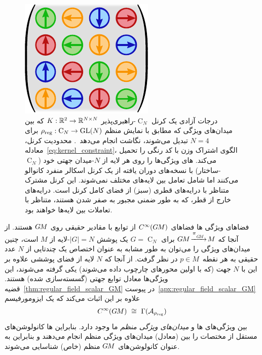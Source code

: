\begin{figure}
    \hspace*{-2ex}
    \includegraphics[width=.24\columnwidth]{figures/regular_C4_kernel.pdf}
    \captionsetup{width=1.1\columnwidth}
    \hspace{2ex}
    \caption{\small
        درجات آزادی یک کرنل $\operatorname{C}_N$-راهبری‌پذیر ${K: \mathbb{R}^2 \to \mathbb{R}^{N\times N}}$ که بین میدان‌های ویژگی که مطابق با نمایش منظم ${\rho_{\textup{reg}}: \operatorname{C}_N \to \operatorname{GL}(N)}$ برای $N=4$ تبدیل می‌شوند، نگاشت انجام می‌دهد~\cite{Weiler2019_E2CNN}.
        محدودیت کرنل، معادله~\eqref{eq:kernel_constraint}، الگوی اشتراک وزن با کد رنگی را تحمیل می‌کند.
        های \citet{Yang2020parallelFrameCNN} ویژگی‌ها را روی هر لایه از $N$-میدان جهتی خود ($\operatorname{C}_N$-ساختار) با نسخه‌های دوران یافته از یک کرنل اسکالر منفرد کانوالو می‌کنند اما شامل تعامل بین لایه‌های مختلف نمی‌شوند.
        این کرنل مشترک متناظر با درایه‌های قطری (سبز) از فضای کامل کرنل است.
        درایه‌های خارج از قطر، که به طور ضمنی مجبور به صفر شدن هستند، متناظر با تعاملات بین لایه‌ها خواهند بود.
    }
    \label{fig:regular_C4_kernel}
\end{figure}

فضاهای ویژگی ها فضاهای $C^\infty(G\mkern-1.4muM)$ از توابع با مقادیر حقیقی روی $G\mkern-1.4muM$ هستند.
از آنجا که $\GM\!\xrightarrow{\piGM}\!M$ برای $G=\operatorname{C}_N$ یک پوشش $|G| = N$-لایه از $M$ است، چنین میدان‌های ویژگی را می‌توان به طور مشابه به عنوان اختصاص یک چندتایی از $N$ عدد حقیقی به هر نقطه~$p\in M$ در نظر گرفت.
از آنجا که $N$ لایه از فضای پوششی علاوه بر این با $N$ جهت (که با اولین محورهای چارچوب داده می‌شوند) یکی گرفته می‌شوند، این ویژگی‌ها معادل توابع جهتی (گسسته‌سازی شده) \citet{poulenard2018multi} هستند.
قضیه~\ref{thm:regular_field_scalar_GM} در پیوست~\ref{apx:regular_field_scalar_GM} علاوه بر این اثبات می‌کند که یک ایزومورفیسم
\begin{align}
    C^\infty(G\mkern-1.4muM)\ \cong\ \Gamma(\mathcal{A}_{\rho_\textup{reg}})
\end{align}
بین ویژگی‌های ها و \emph{میدان‌های ویژگی منظم} ما وجود دارد.
بنابراین ها کانولوشن‌های مستقل از مختصات را بین (معادل) میدان‌های ویژگی منظم انجام می‌دهند و بنابراین به عنوان کانولوشن‌های $G\mkern-1.4muM$ منظم (خاص) شناسایی می‌شوند.


